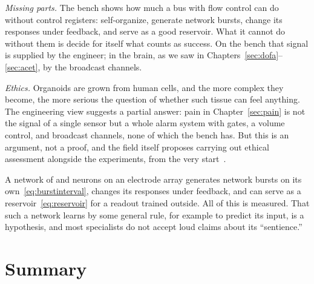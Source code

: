 \emph{Missing parts.} The bench shows how much a  bus with  flow control can do without control registers: self-organize, generate network bursts, change its responses under feedback, and serve as a good reservoir. What it cannot do without them is decide for itself what counts as success. On the bench that signal is supplied by the engineer; in the brain, as we saw in Chapters~\ref{sec:dofa}--\ref{sec:acet}, by the broadcast channels.

\emph{Ethics.} Organoids are grown from human cells, and the more complex they become, the more serious the question of whether such tissue can feel anything. The engineering view suggests a partial answer: pain in Chapter~\ref{sec:pain} is not the signal of a single sensor but a whole alarm system with gates, a volume control, and broadcast channels, none of which the bench has. But this is an argument, not a proof, and the field itself proposes carrying out ethical assessment alongside the experiments, from the very start~\cite{Smirnova2023}.

\begin{keyblock}
\begin{proposition}
\label{prop:livingmachine}
A network of  and  neurons on an electrode array generates network bursts on its own~\eqref{eq:burstinterval}, changes its responses under feedback, and can serve as a reservoir~\eqref{eq:reservoir} for a readout trained outside. All of this is measured. That such a network learns by some general rule, for example to predict its input, is a hypothesis, and most specialists do not accept loud claims about its ``sentience.''
\end{proposition}
\end{keyblock}



\section{Summary}

